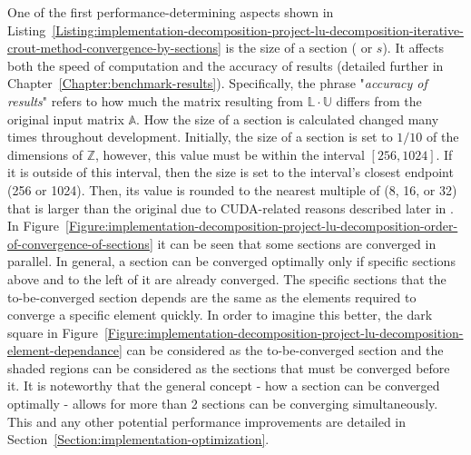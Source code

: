 One of the first performance-determining aspects shown in Listing~\ref{Listing:implementation-decomposition-project-lu-decomposition-iterative-crout-method-convergence-by-sections} is the size of a section ( or $ s $). It affects both the speed of computation and the accuracy of results (detailed further in Chapter~\ref{Chapter:benchmark-results}). Specifically, the phrase "\textit{accuracy of results}" refers to how much the matrix resulting from $ \mathbb{L}\cdot\mathbb{U} $ differs from the original input matrix $ \mathbb{A} $. How the size of a section is calculated changed many times throughout development. Initially, the size of a section is set to $ 1/10 $ of the dimensions of $ \mathbb{Z} $, however, this value must be within the interval $ \left[256, 1024\right] $. If it is outside of this interval, then the size is set to the interval's closest endpoint (256 or 1024). Then, its value is rounded to the nearest multiple of  (8, 16, or 32) that is larger than the original  due to CUDA-related reasons described later in \textit{}. \\
In Figure~\ref{Figure:implementation-decomposition-project-lu-decomposition-order-of-convergence-of-sections} it can be seen that some sections are converged in parallel. In general, a section can be converged optimally only if specific sections above and to the left of it are already converged. The specific sections that the to-be-converged section depends are the same as the elements required to converge a specific element quickly. In order to imagine this better, the dark square in Figure~\ref{Figure:implementation-decomposition-project-lu-decomposition-element-dependance} can be considered as the to-be-converged section and the shaded regions can be considered as the sections that must be converged before it. It is noteworthy that the general concept - how a section can be converged optimally - allows for more than 2 sections can be converging simultaneously. This and any other potential performance improvements are detailed in Section~\ref{Section:implementation-optimization}. \\
